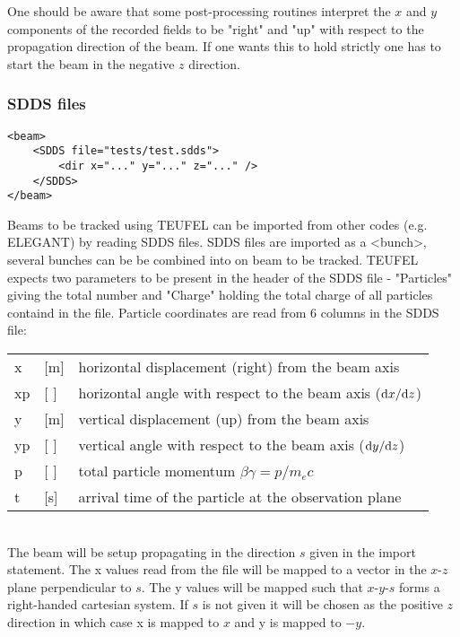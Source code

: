 \documentclass[11pt]{article}
\begin{document}
One should be aware that some post-processing routines interpret the $x$ and $y$ components
of the recorded fields to be "right" and "up" with respect to the propagation direction
of the beam. If one wants this to hold strictly one has to start the beam in the negative $z$ direction.

\subsubsection{SDDS files}

\begin{lstlisting}
<beam>
    <SDDS file="tests/test.sdds">
        <dir x="..." y="..." z="..." />
    </SDDS>
</beam>
\end{lstlisting}

Beams to be tracked using TEUFEL can be imported from other codes (e.g. ELEGANT)
by reading SDDS files. SDDS files are imported as a <bunch>, several bunches can be
be combined into on beam to be tracked. TEUFEL expects two parameters to be present
in the header of the SDDS file - "Particles" giving the total number and
"Charge" holding the total charge of all particles containd in the file.
Particle coordinates are read from 6 columns in the SDDS file:
\\[1ex]
\begin{tabular}{lll}
x & [m] & horizontal displacement (right) from the beam axis \\
xp & [ ] & horizontal angle with respect to the beam axis (${\rm d}x/{\rm d}z$) \\
y & [m] & vertical displacement (up) from the beam axis \\
yp & [ ] & vertical angle with respect to the beam axis (${\rm d}y/{\rm d}z$) \\
p & [ ] & total particle momentum $\beta\gamma = p/m_e c$ \\
t & [s] & arrival time of the particle at the observation plane \\
\end{tabular}\\

The beam will be setup propagating in the direction $s$ given in the import statement.
The x values read from the file will be mapped to a vector in the $x$-$z$ plane
perpendicular to $s$. The y values will be mapped such that $x$-$y$-$s$ forms
a right-handed cartesian system. If $s$ is not given it will be chosen as the positive $z$
direction in which case x is mapped to $x$ and y is mapped to $-y$.
\end{document}
